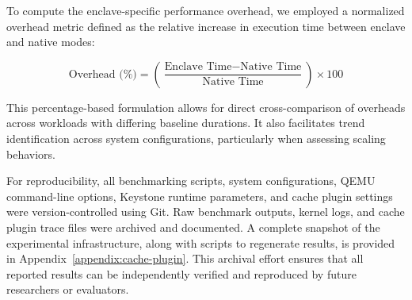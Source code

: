 To compute the enclave-specific performance overhead, we employed a normalized overhead metric defined as the relative increase in execution time between enclave and native modes:

\[
\text{Overhead (\%)} = \left( \frac{\text{Enclave Time} - \text{Native Time}}{\text{Native Time}} \right) \times 100
\]

This percentage-based formulation allows for direct cross-comparison of overheads across workloads with differing baseline durations. It also facilitates trend identification across system configurations, particularly when assessing scaling behaviors.

For reproducibility, all benchmarking scripts, system configurations, QEMU command-line options, Keystone runtime parameters, and cache plugin settings were version-controlled using Git. Raw benchmark outputs, kernel logs, and cache plugin trace files were archived and documented. A complete snapshot of the experimental infrastructure, along with scripts to regenerate results, is provided in Appendix~\ref{appendix:cache-plugin}. This archival effort ensures that all reported results can be independently verified and reproduced by future researchers or evaluators.

